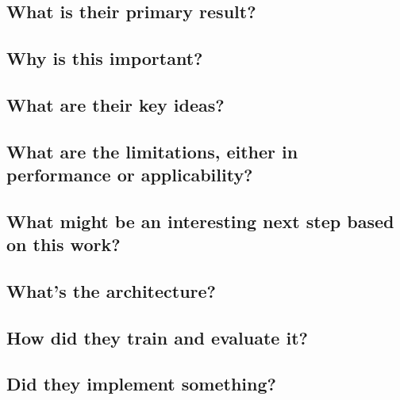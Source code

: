 \section{}

\subsection{What is their primary result?}

\subsection{Why is this important?}

\subsection{What are their key ideas?}

\subsection{What are the limitations, either in performance or applicability?}

\subsection{What might be an interesting next step based on this work?}

\subsection{What's the architecture?}

\subsection{How did they train and evaluate it?}

\subsection{Did they implement something?}


